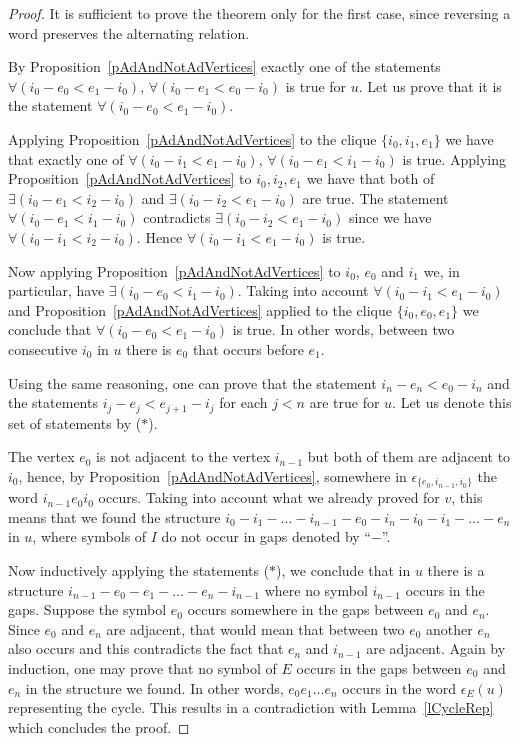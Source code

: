 \documentclass[12pt]{article}
\begin{document}
\begin{proof}
It is sufficient to prove the theorem only for the first case, since reversing a word preserves the alternating relation.

By Proposition~\ref{pAdAndNotAdVertices} exactly one of the statements $\forall (i_0-e_0<e_1-i_0)$, $\forall (i_0-e_1<e_0-i_0)$ is true for $u$. Let us prove that it is the statement $\forall (i_0-e_0<e_1-i_0)$.

Applying Proposition~\ref{pAdAndNotAdVertices} to the clique $\{i_0,i_1,e_1\}$ we have that exactly one of $\forall (i_0-i_1<e_1-i_0)$, $\forall (i_0-e_1<i_1-i_0)$ is true. Applying Proposition~\ref{pAdAndNotAdVertices} to $i_0,i_2,e_1$ we have that both of $\exists (i_0-e_1<i_2-i_0)$ and $\exists (i_0-i_2<e_1-i_0)$ are true. The statement $\forall (i_0-e_1<i_1-i_0)$ contradicts  $\exists (i_0-i_2<e_1-i_0)$ since we have $\forall (i_0-i_1<i_2-i_0)$. Hence $\forall (i_0-i_1<e_1-i_0)$ is true.

Now applying Proposition~\ref{pAdAndNotAdVertices} to $i_0$, $e_0$ and $i_1$ we, in particular, have $\exists (i_0-e_0<i_1-i_0)$. Taking into account $\forall (i_0-i_1<e_1-i_0)$ and Proposition~\ref{pAdAndNotAdVertices} applied to the clique $\{i_0,e_0,e_1\}$ we conclude that $\forall (i_0-e_0<e_1-i_0)$ is true. In other words, between two consecutive $i_0$ in $u$ there is $e_0$ that occurs before $e_1$.

Using the same reasoning, one can prove that the statement $i_n-e_n<e_0-i_n$ and the statements $i_j-e_j<e_{j+1}-i_j$ for each $j<n$ are true for $u$. Let us denote this set of statements by ($\ast$).

The vertex $e_0$ is not adjacent to the vertex $i_{n-1}$ but both of them are adjacent to $i_0$, hence, by Proposition~\ref{pAdAndNotAdVertices}, somewhere in $\epsilon_{\{e_0,i_{n-1},i_0\}}$ the word $i_{n-1}e_0i_0$ occurs. Taking into account what we already proved for $v$, this means that we found the structure $i_0-i_1-\ldots-i_{n-1}-e_0-i_n-i_0-i_1-\ldots-e_n$ in $u$, where symbols of $I$ do not occur in gaps denoted by ``$-$''.

Now inductively applying the statements ($\ast$), we conclude that in $u$ there is a structure $i_{n-1}-e_0-e_1-\ldots-e_n-i_{n-1}$ where no symbol $i_{n-1}$ occurs in the gaps. Suppose the symbol $e_0$ occurs somewhere in the gaps between $e_0$ and $e_n$. Since $e_0$ and $e_n$ are adjacent, that would mean that between two $e_0$ another $e_n$ also occurs and this contradicts the fact that $e_n$ and $i_{n-1}$ are adjacent. Again by induction, one may prove that no symbol of $E$ occurs in the gaps between $e_0$ and $e_n$ in the structure we found. In other words, $e_0e_1\ldots e_n$ occurs in the word $\epsilon_E(u)$ representing the cycle. This results in a contradiction with Lemma~\ref{lCycleRep} which concludes the proof. \end{proof}
\end{document}
